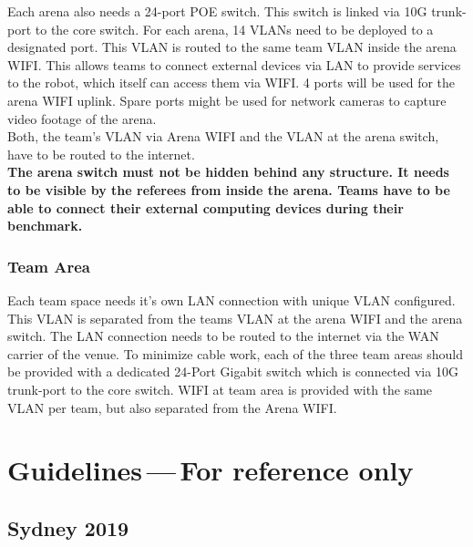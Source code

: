 Each arena also needs a 24-port POE switch. This switch is linked via 10G trunk-port to the core switch. For each arena, 14 VLANs need to be deployed to a designated port. This VLAN is routed to the same team VLAN inside the arena WIFI. This allows teams to connect external devices via LAN to provide services to the robot, which itself can access them via WIFI. 4 ports will be used for the arena WIFI uplink. Spare ports might be used for network cameras to capture video footage of the arena.\\

Both, the team’s VLAN via Arena WIFI and the VLAN at the arena switch, have to be routed to the internet.\\
\textbf{The arena switch must not be hidden behind any structure. It needs to be visible by the referees from inside the arena. Teams have to be able to connect their external computing devices during their benchmark.}

\subsection{Team Area}
Each team space needs it’s own LAN connection with unique VLAN configured. This VLAN is separated from the teams VLAN at the arena WIFI and the arena switch. The LAN connection needs to be routed to the internet via the WAN carrier of the venue. To minimize cable work, each of the three team areas should be provided with a dedicated 24-Port Gigabit switch which is connected via 10G trunk-port to the core switch. WIFI at team area is provided with the same VLAN per team, but also separated from the Arena WIFI.


\chapter[Guidelines]{Guidelines{\color{gray}\,---\,For reference only}}
\section{Sydney 2019}

